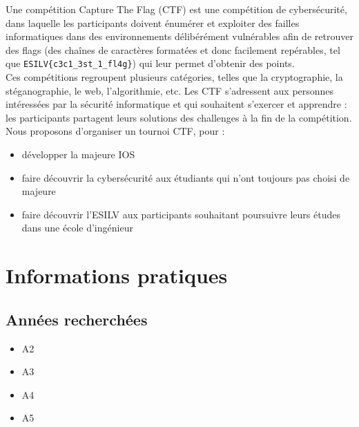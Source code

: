 \documentclass[12pt]{article}
\begin{document}
    Une compétition Capture The Flag (CTF) est une compétition de cybersécurité, dans laquelle les participants doivent énumérer et exploiter des failles informatiques dans des environnements délibérément vulnérables afin de retrouver des flags (des chaînes de caractères formatées et donc facilement repérables, tel que \verb+ESILV{c3c1_3st_1_fl4g}+) qui leur permet d’obtenir des points.\\ Ces compétitions regroupent plusieurs catégories, telles que la cryptographie, la stéganographie, le web, l’algorithmie, etc. Les CTF s’adressent aux personnes intéressées par la sécurité informatique et qui souhaitent s’exercer et apprendre : les participants partagent leurs solutions des challenges à la fin de la compétition. Nous proposons d’organiser un tournoi CTF, pour :
    \begin{itemize}
        \item{développer la majeure IOS}
        \item{faire découvrir la cybersécurité aux étudiants qui n’ont toujours pas choisi de majeure}
        \item{faire découvrir l’ESILV aux participants souhaitant poursuivre leurs études dans une école d’ingénieur}
    \end{itemize}

	\section{Informations pratiques}
	\subsection{Années recherchées}
	\begin{itemize}
		\item A2
		\item A3
		\item A4
		\item A5
	\end{itemize}
\end{document}

